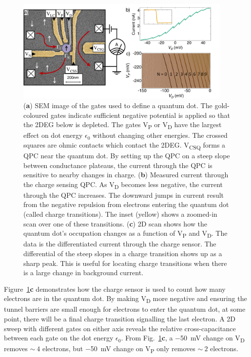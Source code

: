 \begin{figure}[H]
 \begin{center}
 \includegraphics[width=0.95\textwidth]{figures/ch1/figure6.pdf}
 \caption[Charge Sensing a Quantum Dot]{\label{fig:ch1/ct_intro} 
 (\textbf{a}) SEM image of the gates used to define a quantum dot. The gold-coloured gates indicate sufficient negative potential is applied so that the 2DEG below is depleted. The gates V\textsubscript{P} or V\textsubscript{D} have the largest effect on dot energy $\epsilon_0$ without changing other energies. The crossed squares are ohmic contacts which contact the 2DEG. V\textsubscript{CSQ} forms a QPC near the quantum dot. By setting up the QPC on a steep slope between conductance plateaus, the current through the QPC is sensitive to nearby changes in charge. (\textbf{b}) Measured current through the charge sensing QPC. As V\textsubscript{D} becomes less negative, the current through the QPC increases. The downward jumps in current result from the negative repulsion from electrons entering the quantum dot (called charge transitions). The inset (yellow) shows a zoomed-in scan over one of these transitions. (\textbf{c}) 2D scan shows how the quantum dot's occupation changes as a function of V\textsubscript{P} and V\textsubscript{D}. The data is the differentiated current through the charge sensor. The differential of the steep slopes in a charge transition shows up as a sharp peak. This is useful for locating charge transitions when there is a large change in background current. 
 }
 \end{center}
\end{figure}



Figure~\ref{fig:ch1/ct_intro}\textbf{c} demonstrates how the charge sensor is used to count how many electrons are in the quantum dot. By making V\textsubscript{D} more negative and ensuring the tunnel barriers are small enough for electrons to enter the quantum dot, at some point, there will be a final charge transition signalling the last electron. A 2D sweep with different gates on either axis reveals the relative cross-capacitance between each gate on the dot energy $\epsilon_0$. From Fig.~\ref{fig:ch1/ct_intro}\textbf{c}, a \qty{-50}{mV} change on V\textsubscript{D} removes $\sim~4$ electrons, but \qty{-50}{mV} change on V\textsubscript{P} only removes $\sim~2$ electrons.



